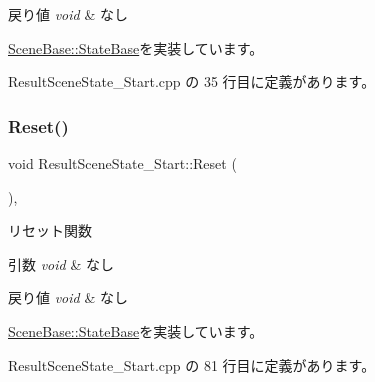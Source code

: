 \begin{DoxyRetVals}{戻り値}
{\em void} & なし \\
\hline
\end{DoxyRetVals}


\mbox{\hyperlink{class_scene_base_1_1_state_base_a33350231b039a2178c19beac0211c5b8}{Scene\+Base\+::\+State\+Base}}を実装しています。



 Result\+Scene\+State\+\_\+\+Start.\+cpp の 35 行目に定義があります。

\mbox{\label{class_result_scene_state___start_a8f776a7b2d31451c434fb74ffdd65960}} 
\subsubsection{\texorpdfstring{Reset()}{Reset()}}
{\footnotesize\ttfamily void Result\+Scene\+State\+\_\+\+Start\+::\+Reset (\begin{DoxyParamCaption}{ }\end{DoxyParamCaption})\hspace{0.3cm}{\ttfamily [override]}, {\ttfamily [virtual]}}



リセット関数 


\begin{DoxyParams}{引数}
{\em void} & なし \\
\hline
\end{DoxyParams}

\begin{DoxyRetVals}{戻り値}
{\em void} & なし \\
\hline
\end{DoxyRetVals}


\mbox{\hyperlink{class_scene_base_1_1_state_base_a2e14a3afece0b1d8db9edcebf514a977}{Scene\+Base\+::\+State\+Base}}を実装しています。



 Result\+Scene\+State\+\_\+\+Start.\+cpp の 81 行目に定義があります。

\mbox{\label{class_result_scene_state___start_af5b9af607074e3296481a1660607fb9a}} 
